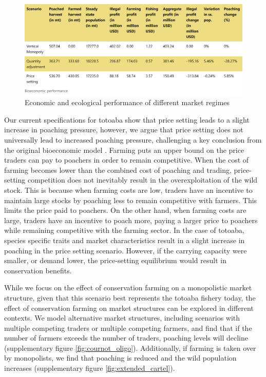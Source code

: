 \begin{figure}[h]
    \centering
    \includegraphics[width=0.85\linewidth]{figures/totoaba/bioecon_perf.png}
    \caption{Economic and ecological performance of different market regimes}
    \label{fig:table}
\end{figure}

Our current specifications for totoaba show that price setting leads to a slight increase in poaching pressure, however, we argue that price setting does not universally lead to increased poaching pressure, challenging a key conclusion from the original bioeconomic model \citep{bulte_economic_2005, damania_economics_2007}. Farming puts an upper bound on the price traders can pay to poachers in order to remain competitive. When the cost of farming becomes lower than the combined cost of poaching and trading, price-setting competition does not inevitably result in the overexploitation of the wild stock. This is because when farming costs are low, traders have an incentive to maintain large stocks by poaching less to remain competitive with farmers. This limits the price paid to poachers. On the other hand, when farming costs are large, traders have an incentive to poach more, paying a larger price to poachers while remaining competitive with the farming sector.  In the case of totoaba, species specific traits and market characteristics result in a slight increase in poaching in the price setting scenario. However, if the carrying capacity were smaller, or demand lower, the price-setting equilibrium would result in conservation benefits. 

While we focus on the effect of conservation farming on a monopolistic market structure, given that this scenario best represents the totoaba fishery today, the effect of conservation farming on market structures can be explored in different contexts. We model alternative market structures, including scenarios with multiple competing traders or multiple competing farmers, and find that if the number of farmers exceeds the number of traders, poaching levels will decline (supplementary figure \ref{fig:cournot_oligo}). Additionally, if farming is taken over by monopolists, we find that poaching is reduced and the wild population increases (supplementary figure \ref{fig:extended_cartel}).


